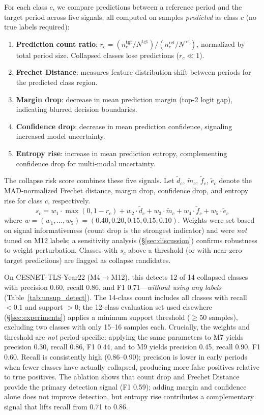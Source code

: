 \documentclass[journal]{IEEEtran}
\begin{document}
For each class $c$, we compare predictions between a reference period and the target period across five signals, all computed on samples \textit{predicted} as class $c$ (no true labels required):
\begin{enumerate}
  \item \textbf{Prediction count ratio}: $r_c = (n_c^{\text{tgt}}/N^{\text{tgt}}) / (n_c^{\text{ref}}/N^{\text{ref}})$, normalized by total period size. Collapsed classes lose predictions ($r_c \ll 1$).
  \item \textbf{Frechet Distance}: measures feature distribution shift between periods for the predicted class region.
  \item \textbf{Margin drop}: decrease in mean prediction margin (top-2 logit gap), indicating blurred decision boundaries.
  \item \textbf{Confidence drop}: decrease in mean prediction confidence, signaling increased model uncertainty.
  \item \textbf{Entropy rise}: increase in mean prediction entropy, complementing confidence drop for multi-modal uncertainty.
\end{enumerate}

The collapse risk score combines these five signals.
Let $\tilde{d}_c$, $\tilde{m}_c$, $\tilde{f}_c$, $\tilde{e}_c$ denote the MAD-normalized Frechet distance, margin drop, confidence drop, and entropy rise for class $c$, respectively.
\begin{equation}
  s_c = w_1 \cdot \max(0, 1{-}r_c) + w_2 \cdot \tilde{d}_c + w_3 \cdot \tilde{m}_c + w_4 \cdot \tilde{f}_c + w_5 \cdot \tilde{e}_c
\end{equation}
where $w = (w_1, \ldots, w_5) = (0.40, 0.20, 0.15, 0.15, 0.10)$.
Weights were set based on signal informativeness (count drop is the strongest indicator) and were \textit{not} tuned on M12 labels; a sensitivity analysis (\S\ref{sec:discussion}) confirms robustness to weight perturbation.
Classes with $s_c$ above a threshold (or with near-zero target predictions) are flagged as collapse candidates.

On CESNET-TLS-Year22 (M4$\to$M12), this detects 12 of 14 collapsed classes with precision 0.60, recall 0.86, and F1 0.71---\textit{without using any labels} (Table~\ref{tab:unsup_detect}).
The 14-class count includes all classes with recall $<0.1$ and support $>0$; the 12-class evaluation set used elsewhere (\S\ref{sec:experiments}) applies a minimum support threshold ($\geq$50 samples), excluding two classes with only 15--16 samples each.
Crucially, the weights and threshold are \textit{not} period-specific: applying the same parameters to M7 yields precision 0.30, recall 0.86, F1 0.44, and to M9 yields precision 0.45, recall 0.90, F1 0.60. Recall is consistently high (0.86--0.90); precision is lower in early periods when fewer classes have actually collapsed, producing more false positives relative to true positives.
The ablation shows that count drop and Frechet Distance provide the primary detection signal (F1 0.59); adding margin and confidence alone does not improve detection, but entropy rise contributes a complementary signal that lifts recall from 0.71 to 0.86.
\end{document}
